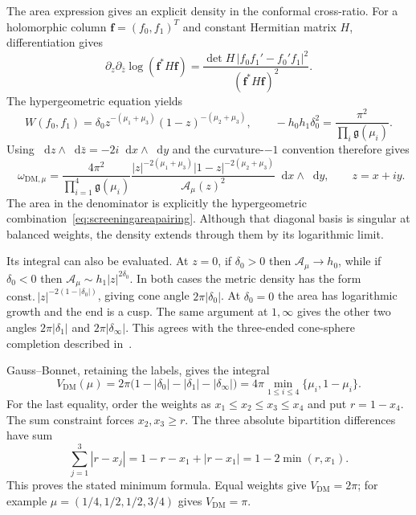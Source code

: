 \documentclass[11pt,a4paper]{article}
\numberwithin{equation}{section}
\theoremstyle{definition}
\theoremstyle{remark}
\newcommand{\dd}{\mathop{}\!\mathrm d}
\begin{document}
The area expression gives an explicit density in the conformal
cross-ratio. For a holomorphic column $\boldsymbol f=(f_0,f_1)^T$
and constant Hermitian matrix $H$, differentiation gives
\begin{equation}
 \partial_z\partial_{\bar z}\log(\boldsymbol f^*H\boldsymbol f)
 =\frac{\det H\,|f_0f_1'-f_0'f_1|^2}
        {(\boldsymbol f^*H\boldsymbol f)^2}.
 \label{eq:HermitianWronskian}
\end{equation}
The hypergeometric equation yields
\begin{equation}
 W(f_0,f_1)=\delta_0
      z^{-(\mu_1+\mu_3)}(1-z)^{-(\mu_2+\mu_3)},
 \qquad
 -h_0h_1\delta_0^2
       =\frac{\pi^2}{\prod_i\mathfrak g(\mu_i)}.
 \label{eq:screeningWronskian}
\end{equation}
Using $\dd z\wedge\dd\bar z=-2i\dd x\wedge\dd y$ and
the curvature-$-1$ convention therefore gives
\begin{equation}
 \boxed{\quad
 \omega_{\mathrm{DM},\mu}
 =\frac{4\pi^2}{\prod_{i=1}^4\mathfrak g(\mu_i)}
  \frac{|z|^{-2(\mu_1+\mu_3)}
        |1-z|^{-2(\mu_2+\mu_3)}}{\mathcal A_\mu(z)^2}
       \dd x\wedge\dd y,\qquad z=x+iy.
 \quad}
 \label{eq:general4DMdensity}
\end{equation}
The area in the denominator is explicitly the hypergeometric
combination~\eqref{eq:screeningareapairing}. Although that
diagonal basis is singular at balanced weights, the density
extends through them by its logarithmic limit.

Its integral can also be evaluated. At $z=0$, if $\delta_0>0$
then $\mathcal A_\mu\to h_0$, while if $\delta_0<0$ then
$\mathcal A_\mu\sim h_1|z|^{2\delta_0}$. In both cases
the metric density has the form
$\text{const.}\,|z|^{-2(1-|\delta_0|)}$, giving cone
angle $2\pi|\delta_0|$. At $\delta_0=0$ the area has
logarithmic growth and the end is a cusp. The same argument
at $1,\infty$ gives the other two angles
$2\pi|\delta_1|$ and $2\pi|\delta_\infty|$.
This agrees with the three-ended cone-sphere completion
described in~\cite[Section~5]{Kojima}.

Gauss--Bonnet, retaining the labels, gives the integral
\begin{equation}
 \boxed{\quad
 V_{\mathrm{DM}}(\mu)
 =2\pi\bigl(1-|\delta_0|-|\delta_1|-|\delta_\infty|\bigr)
 =4\pi\min_{1\le i\le4}\{\mu_i,1-\mu_i\}.
 \quad}
 \label{eq:general4DMvolume}
\end{equation}
For the last equality, order the weights as
$x_1\le x_2\le x_3\le x_4$ and put $r=1-x_4$.
The sum constraint forces $x_2,x_3\ge r$. The three absolute
bipartition differences have sum
\[
 \sum_{j=1}^3|r-x_j|
   =1-r-x_1+|r-x_1|=1-2\min(r,x_1).
\]
This proves the stated minimum formula. Equal weights give
$V_{\mathrm{DM}}=2\pi$; for example
$\mu=(1/4,1/2,1/2,3/4)$ gives $V_{\mathrm{DM}}=\pi$.
\end{document}

